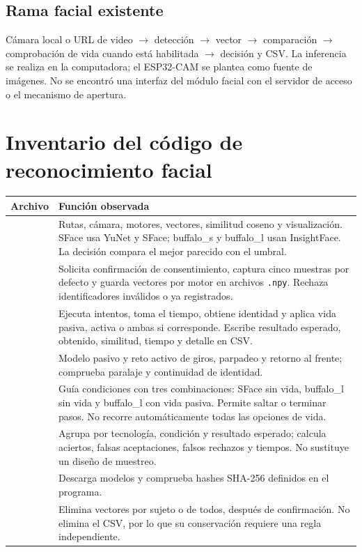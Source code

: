\documentclass[11pt,letterpaper]{article}
\newcommand{\pagina}[1]{\clearpage\section{#1}}
\begin{document}
\subsection{Rama facial existente}
Cámara local o URL de video $\rightarrow$ detección $\rightarrow$ vector $\rightarrow$ comparación $\rightarrow$ comprobación de vida cuando está habilitada $\rightarrow$ decisión y CSV. La inferencia se realiza en la computadora; el ESP32-CAM se plantea como fuente de imágenes. No se encontró una interfaz del módulo facial con el servidor de acceso o el mecanismo de apertura.

\pagina{Inventario del código de reconocimiento facial}
\begin{longtable}{P{3.8cm}P{11cm}}
\toprule Archivo & Función observada \\ \midrule
\endhead
{} & Rutas, cámara, motores, vectores, similitud coseno y visualización. SFace usa YuNet y SFace; buffalo\_s y buffalo\_l usan InsightFace. La decisión compara el mejor parecido con el umbral. \\[0.4em]
 & Solicita confirmación de consentimiento, captura cinco muestras por defecto y guarda vectores por motor en archivos \texttt{.npy}. Rechaza identificadores inválidos o ya registrados. \\[0.4em]
 & Ejecuta intentos, toma el tiempo, obtiene identidad y aplica vida pasiva, activa o ambas si corresponde. Escribe resultado esperado, obtenido, similitud, tiempo y detalle en CSV. \\[0.4em]
 & Modelo pasivo y reto activo de giros, parpadeo y retorno al frente; comprueba paralaje y continuidad de identidad. \\[0.4em]
 & Guía condiciones con tres combinaciones: SFace sin vida, buffalo\_l sin vida y buffalo\_l con vida pasiva. Permite saltar o terminar pasos. No recorre automáticamente todas las opciones de vida. \\[0.4em]
 & Agrupa por tecnología, condición y resultado esperado; calcula aciertos, falsas aceptaciones, falsos rechazos y tiempos. No sustituye un diseño de muestreo. \\[0.4em]
 & Descarga modelos y comprueba hashes SHA-256 definidos en el programa. \\[0.4em]
 & Elimina vectores por sujeto o de todos, después de confirmación. No elimina el CSV, por lo que su conservación requiere una regla independiente. \\ \bottomrule
\end{longtable}
\end{document}
